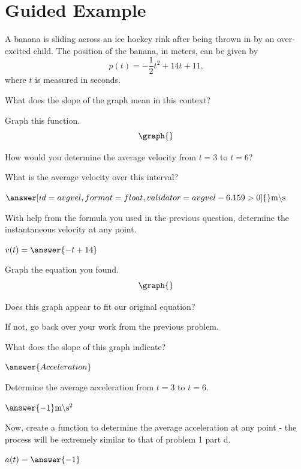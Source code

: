 \documentclass{ximera}
\begin{document}
\section{Guided Example}
\begin{question}
A banana is sliding across an ice hockey rink after being thrown in by an over-excited child. The position of the banana, in meters, can be given by $$p(t) = -\dfrac{1}{2}t^2+14t+11\text{,}$$ where $t$ is measured in seconds.

What does the slope of the graph mean in this context?
\begin{multipleChoice}
\end{multipleChoice}

Graph this function.
\[
    \graph{}
\]

How would you determine the average velocity from $t = 3$ to $t = 6$?

\begin{multipleChoice}
\end{multipleChoice}


What is the average velocity over this interval?

$\answer[id = avgvel, format=float,validator=avgvel-6.159>0]{}\text{m} \backslash \text{s}$

With help from the formula you used in the previous question, determine the instantaneous velocity at any point.

$v(t) =  \answer{-t+14}$


Graph the equation you found.
\[
    \graph{}
\]

Does this graph appear to fit our original equation?

\begin{multipleChoice}
\end{multipleChoice}

If not, go back over your work from the previous problem.


What does the slope of this graph indicate?

$\answer{Acceleration}$

Determine the average acceleration from $t = 3$ to $t = 6$.

$\answer{-1} \text{m} \backslash \text{s}^2$

Now, create a function to determine the average acceleration at any point - the process will be extremely similar to that of problem 1 part d.

$a(t) = \answer{-1}$
\end{question}
\end{document}
